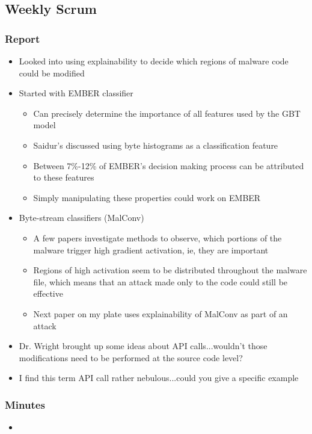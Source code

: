 \documentclass{article}
\begin{document}
\subsection*{Weekly Scrum}
\subsubsection*{Report}
\begin{itemize}
	\item Looked into using explainability to decide which regions of malware code could be modified
	\item Started with EMBER classifier
	\begin{itemize}
		\item Can precisely determine the importance of all features used by the GBT model
		\item Saidur's discussed using byte histograms as a classification feature
		\item Between 7\%-12\% of EMBER's decision making process can be attributed to these features
		\item Simply manipulating these properties could work on EMBER
	\end{itemize}
	\item Byte-stream classifiers (MalConv)
	\begin{itemize}
		\item A few papers investigate methods to observe, which portions of the malware trigger high gradient activation, ie, they are important
		\item Regions of high activation seem to be distributed throughout the malware file, which means that an attack made only to the code could still be effective
		\item Next paper on my plate uses explainability of MalConv as part of an attack
	\end{itemize}
	\item Dr. Wright brought up some ideas about API calls...wouldn't those modifications need to be performed at the source code level? 
	\item I find this term API call rather nebulous...could you give a specific example
\end{itemize}
\subsubsection*{Minutes}
\begin{itemize}
	\item 
\end{itemize}
\end{document}
